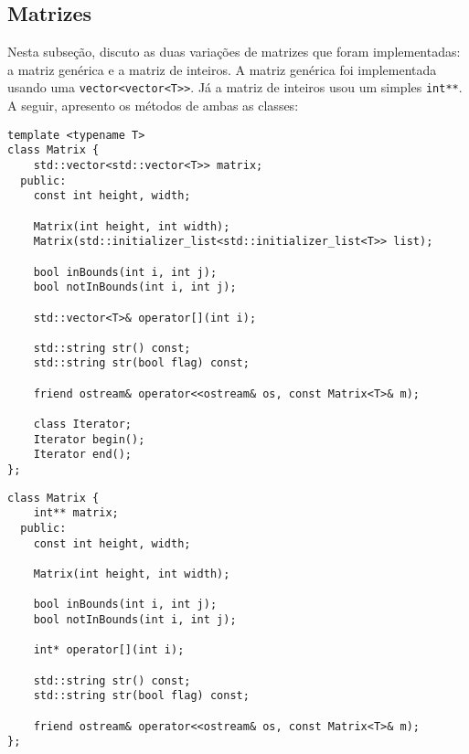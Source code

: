 \documentclass[12pt]{article}
\begin{document}
\newpage %

\subsection{Matrizes}

Nesta subseção, discuto as duas variações de matrizes que foram implementadas: a matriz genérica e a matriz de inteiros. A matriz genérica foi implementada usando uma \texttt{vector<vector<T>>}. Já a matriz de inteiros usou um simples \texttt{int**}. A seguir, apresento os métodos de ambas as classes:

\begin{verbatim}
template <typename T>
class Matrix {
    std::vector<std::vector<T>> matrix;
  public:
    const int height, width;

    Matrix(int height, int width);
    Matrix(std::initializer_list<std::initializer_list<T>> list);
    
    bool inBounds(int i, int j);
    bool notInBounds(int i, int j);
    
    std::vector<T>& operator[](int i);
    
    std::string str() const;
    std::string str(bool flag) const;
    
    friend ostream& operator<<ostream& os, const Matrix<T>& m);
    
    class Iterator;
    Iterator begin();
    Iterator end();
};
\end{verbatim}

\begin{verbatim}
class Matrix {
    int** matrix;
  public:
    const int height, width;

    Matrix(int height, int width);
    
    bool inBounds(int i, int j);
    bool notInBounds(int i, int j);
    
    int* operator[](int i);
    
    std::string str() const;
    std::string str(bool flag) const;
    
    friend ostream& operator<<ostream& os, const Matrix<T>& m);
};
\end{verbatim}

\newpage %
\end{document}
